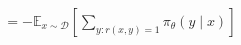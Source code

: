 \documentclass[preview]{standalone}
\begin{document}
\begin{align*}
= -\mathbb{E}_{x \sim \mathcal{D}}\!\left[\sum_{y : r(x,y)=1}\pi_\theta(y \mid x)\right]
\end{align*}
\end{document}
